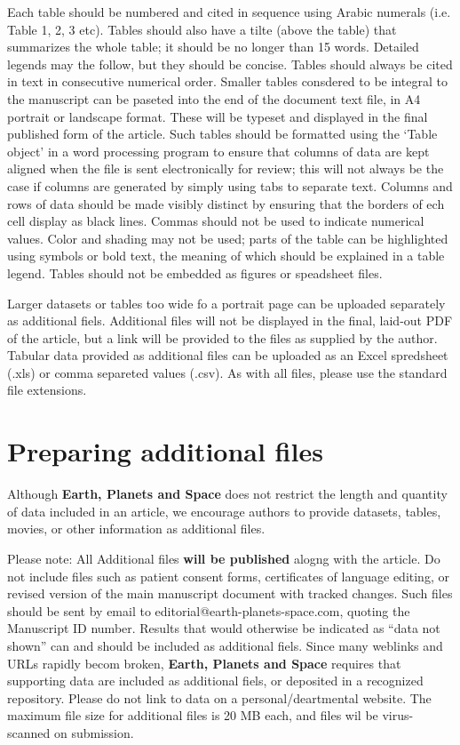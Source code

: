 \documentclass{EPS}
\begin{document}
Each table should be numbered and cited in sequence
using Arabic numerals (i.e. Table 1, 2, 3 etc).
Tables should also have a tilte (above the table)
that summarizes the whole table;
it should be no longer than 15 words.
Detailed legends may the follow, but they should be concise.
Tables should always be cited in text in consecutive numerical order.
Smaller tables consdered to be integral to the manuscript can be
paseted into the end of the document text file,
in A4 portrait or landscape format.
These will be typeset and displayed in the final published form
of the article.
Such tables should be formatted using the `Table object'
in a word processing program to ensure that
columns of data are kept aligned when the file is sent
electronically for review;
this will not always be the case if columns are generated by
simply using tabs to separate text.
Columns and rows of data should be made visibly distinct
by ensuring that the borders of ech cell display as black lines.
Commas should not be used to indicate numerical values.
Color and shading may not be used;
parts of the table can be highlighted using symbols or bold text,
the meaning of which should be explained in a table legend.
Tables should not be embedded as figures or speadsheet files.

Larger datasets or tables too wide fo a portrait page
can be uploaded separately as additional fiels.
Additional files will not be displayed in the final,
laid-out PDF of the article, but a link will be provided
to the files as supplied by the author.
Tabular data provided as additional files can be uploaded
as an Excel spredsheet (.xls) or comma separeted values (.csv).
As with all files, please use the standard file extensions.

\section{Preparing additional files}

Although \textbf{Earth, Planets and Space} does not restrict
the length and quantity of data included in an article,
we encourage authors to provide datasets, tables, movies,
or other information as additional files.

Please note:
All Additional files \textbf{will be published} alogng with the article.
Do not include files such as patient consent forms,
certificates of language editing,
or revised version of the main manuscript document with tracked changes.
Such files should be sent by email to
editorial@earth-planets-space.com,
quoting the Manuscript ID number.
Results that would otherwise be indicated as ``data not shown''
can and should be included as additional fiels.
Since many weblinks and URLs rapidly becom broken,
\textbf{Earth, Planets and Space} requires that
supporting data are included as additional fiels,
or deposited in a recognized repository.
Please do not link to data on a personal/deartmental website.
The maximum file size for additional files is 20 MB each,
and files wil be virus-scanned on submission.
\end{document}
